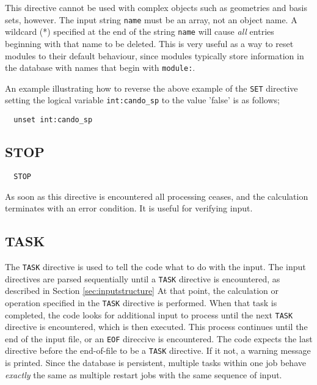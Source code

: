 This directive cannot be used with complex objects such as geometries and
basis sets, however.  The input string \verb+name+ must be an array, not
an object name. A wildcard (*) specified at the end of the 
string \verb+name+ will cause {\em all}
entries beginning with that name to be deleted.  This is very useful as a
way to reset modules to their default behaviour, since modules typically store
information in the database with names that begin with
\verb+module:+.

An example illustrating how to reverse the above example of the
\verb+SET+ directive setting the logical variable \verb+int:cando_sp+ 
to the value 'false' is as follows;

\begin{verbatim}
  unset int:cando_sp
\end{verbatim}



\subsection{STOP}

\begin{verbatim}
  STOP
\end{verbatim}

As soon as this directive is encountered all processing ceases, and
the calculation terminates with an error condition.  It is useful for
verifying input.

\subsection{TASK}
\label{sec:task}

The \verb+TASK+ directive is used to tell the code what to do with the input.
The input directives are parsed
sequentially until a \verb+TASK+ directive is encountered, as described
in Section \ref{sec:inputstructure}  At that
point, the calculation or operation specified in the \verb+TASK+ directive
is performed.  When that task is completed,
the code looks for additional input to process until the next
\verb+TASK+ directive is encountered, which is then executed.  This 
process continues until the end of the input file, or an \verb+EOF+
direccive is encountered.  The code expects the last directive before the
end-of-file to be a \verb+TASK+ directive.  If it not, a warning message 
is printed.  Since the
database is persistent, multiple tasks within one job behave {\em
  exactly} the same as multiple restart jobs with the same sequence of
input.

